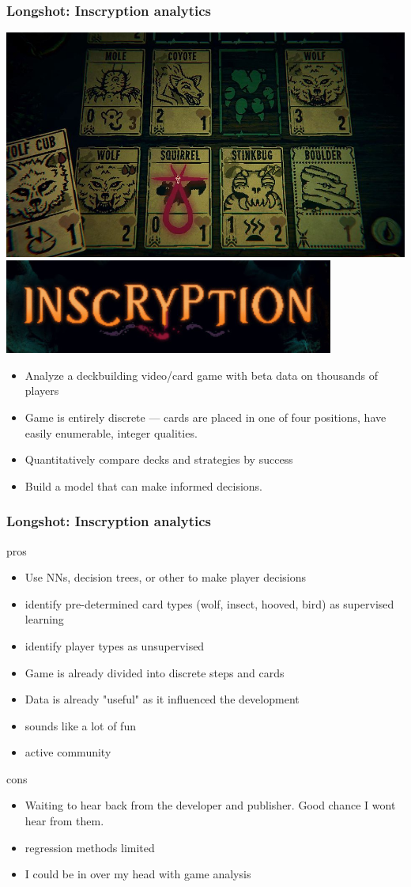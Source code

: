 \documentclass[aspectratio=169,12pt]{beamer}
\begin{document}
\begin{frame}
\frametitle{Longshot: Inscryption analytics}
\begin{center}
	\hfill\includegraphics[width=0.5\linewidth]{pix/inscryption}\hfill\includegraphics[width=0.3\linewidth]{pix/logo}\hfill
\end{center}
\begin{itemize}
	\item Analyze a deckbuilding video/card game with beta data on thousands of players
	\item Game is entirely discrete --- cards are placed in one of four positions, have easily enumerable, integer qualities.
	\item Quantitatively compare decks and strategies by success
	\item Build a model that can make informed decisions.
\end{itemize}
\end{frame}

\begin{frame}
	\frametitle{Longshot: Inscryption analytics}
	\begin{block}{pros}
		\begin{itemize}
			\item Use NNs, decision trees, or other to make player decisions
			\item identify pre-determined card types (wolf, insect, hooved, bird) as supervised learning
			\item identify player types as unsupervised
			\item Game is already divided into discrete steps and cards
			\item Data is already "useful" as it influenced the development
			\item sounds like a lot of fun
			\item active community
		\end{itemize}
	\end{block}
\begin{alertblock}{cons}
	\begin{itemize}
		\scriptsize
		\item Waiting to hear back from the developer and publisher. Good chance I wont hear from them.
		\item regression methods limited
		\item I could be in over my head with game analysis
	\end{itemize}
	\end{alertblock}
\end{frame}
\end{document}
